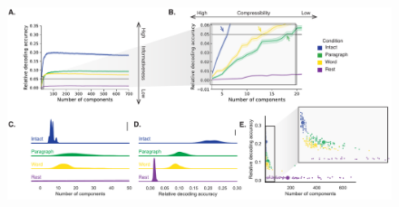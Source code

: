 \documentclass[english, 11pt]{article}
\begin{document}
\begin{figure}[tp]
  \centering

  \includegraphics[width=\textwidth]{figs/decoding_and_inflection}


\end{figure}
\end{document}
